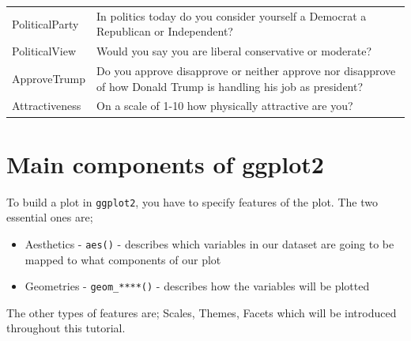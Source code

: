 \documentclass[]{book}
\begin{document}
\begin{longtable}[]{@{}ll@{}}
\begin{minipage}[t]{0.11\columnwidth}
PoliticalParty\strut
\end{minipage} & \begin{minipage}[t]{0.83\columnwidth}\raggedright
In politics today do you consider yourself a Democrat a Republican or Independent?\strut
\end{minipage}\tabularnewline
\begin{minipage}[t]{0.11\columnwidth}\raggedright
PoliticalView\strut
\end{minipage} & \begin{minipage}[t]{0.83\columnwidth}\raggedright
Would you say you are liberal conservative or moderate?\strut
\end{minipage}\tabularnewline
\begin{minipage}[t]{0.11\columnwidth}\raggedright
ApproveTrump\strut
\end{minipage} & \begin{minipage}[t]{0.83\columnwidth}\raggedright
Do you approve disapprove or neither approve nor disapprove of how Donald Trump is handling his job as president?\strut
\end{minipage}\tabularnewline
\begin{minipage}[t]{0.11\columnwidth}\raggedright
Attractiveness\strut
\end{minipage} & \begin{minipage}[t]{0.83\columnwidth}\raggedright
On a scale of 1-10 how physically attractive are you?\strut
\end{minipage}\tabularnewline
\bottomrule
\end{longtable}

\hypertarget{main-components-of-ggplot2}{%
\section{Main components of ggplot2}\label{main-components-of-ggplot2}}

To build a plot in \texttt{ggplot2}, you have to specify features of the plot. The two essential ones are;

\begin{itemize}
\item
  Aesthetics - \texttt{aes()} - describes which variables in our dataset are going to be mapped to what components of our plot
\item
  Geometries - \texttt{geom\_****()} - describes how the variables will be plotted
\end{itemize}

The other types of features are; Scales, Themes, Facets which will be introduced throughout this tutorial.
\end{document}
